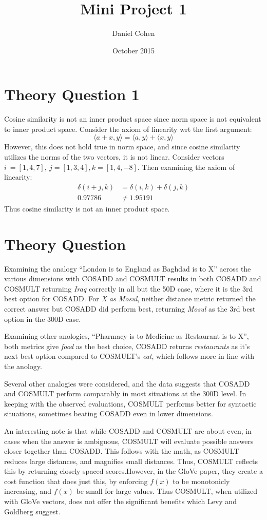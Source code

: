 \documentclass{article}
\title{Mini Project 1}
\author{Daniel Cohen}
\date{October 2015}
\begin{document}
\maketitle

\section{Theory Question 1}
Cosine similarity is not an inner product space since norm space is not
equivalent to inner product space. Consider the axiom of linearity wrt the first
argument:
$$\langle {a+x,y} \rangle = \langle {a,y} \rangle + \langle {x,y} \rangle $$
However, this does not hold true in norm space, and since cosine similarity
utilizes the norms of the two vectors, it is not linear. Consider vectors $i~=
[1,4,7],~j = [1,3,4], k = [1,4,-8]$. Then examining the axiom of linearity:
\begin{align*}
  \delta (i+j,k) &= \delta(i,k) + \delta (j,k)\\
  0.97786 &\neq 1.95191
\end{align*}
Thus cosine similarity is not an inner product space.

\section{Theory Question}

Examining the analogy ``London is to England as Baghdad is to X'' across
the various dimensions with COSADD and COSMULT results in both COSADD and
COSMULT returning \textit{Iraq} correctly in all but the 50D case, where it is
the 3rd best option for COSADD. For \textit{X as Mosul}, neither distance metric
returned the correct answer but COSADD did perform best, returning \textit{Mosul}
as the 3rd best option in the 300D case.

Examining other anologies, ``Pharmacy is to Medicine as Restaurant is to X'',
both metrics give \textit{food} as the best
choice, COSADD returns \textit{restaurants} as it's next best option compared to
COSMULT's \textit{eat}, which follows more in line with the anology.

Several other analogies were considered, and the data suggests that COSADD
and COSMULT perform comparably in most situations at the 300D level. In keeping
with the observed evaluations, COSMULT performs better for syntactic situations,
sometimes beating COSADD even in lower dimensions.

An interesting note is that while COSADD and COSMULT are about even, in cases
when the answer is ambiguous, COSMULT will evaluate possible answers closer
together than COSADD. This follows with the math, as COSMULT reduces large
distances, and magnifies small distances. Thus, COSMULT
reflects this by returning closely spaced scores.However, in the GloVe paper,
they create a cost function that does just this, by enforcing $f(x)$ to be
monotonicly increasing, and $f(x)$ be small for large values. Thus COSMULT, when
utilized with GloVe vectors, does not offer the significant benefits which Levy
and Goldberg suggest.
\end{document}
